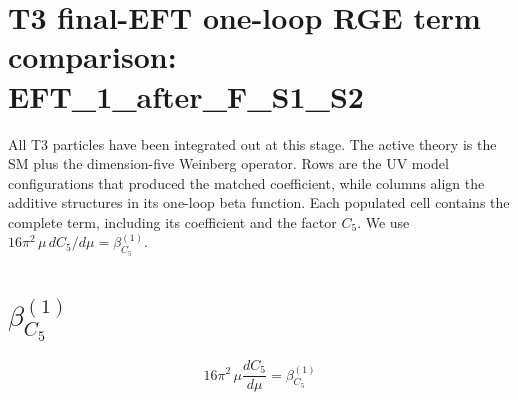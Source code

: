 \documentclass[8pt]{article}
\begin{document}
\begin{landscape}
\section*{T3 final-EFT one-loop RGE term comparison: EFT\_1\_after\_F\_S1\_S2}
All T3 particles have been integrated out at this stage. The active theory is the SM plus the dimension-five Weinberg operator. Rows are the UV model configurations that produced the matched coefficient, while columns align the additive structures in its one-loop beta function. Each populated cell contains the complete term, including its coefficient and the factor $C_5$.
\medskip
We use $16\pi^2\,\mu\,dC_5/d\mu=\beta_{C_5}^{(1)}$.
\section*{$\beta_{C_5}^{(1)}$}
\[16\pi^2\,\mu\frac{dC_5}{d\mu}=\beta_{C_5}^{(1)}\]

\end{landscape}
\end{document}
